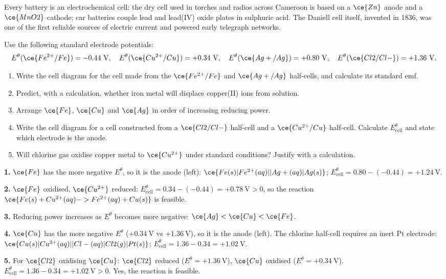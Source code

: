 \documentclass[11pt]{article}
\begin{document}
\begin{savaistu}
Every battery is an electrochemical cell: the dry cell used in torches and radios across Cameroon is based on a $\ce{Zn}$ anode and a $\ce{MnO2}$ cathode; car batteries couple lead and lead(IV) oxide plates in sulphuric acid. The Daniell cell itself, invented in 1836, was one of the first reliable sources of electric current and powered early telegraph networks.
\end{savaistu}

\begin{exercice}
Use the following standard electrode potentials:
\[
E^\theta(\ce{Fe^{2+}/Fe}) = -0.44\ \mathrm{V},\quad E^\theta(\ce{Cu^{2+}/Cu}) = +0.34\ \mathrm{V},\quad E^\theta(\ce{Ag+/Ag}) = +0.80\ \mathrm{V},\quad E^\theta(\ce{Cl2/Cl-}) = +1.36\ \mathrm{V}.
\]
\begin{enumerate}
\item Write the cell diagram for the cell made from the $\ce{Fe^{2+}/Fe}$ and $\ce{Ag+/Ag}$ half-cells, and calculate its standard emf.
\item Predict, with a calculation, whether iron metal will displace copper(II) ions from solution.
\item Arrange $\ce{Fe}$, $\ce{Cu}$ and $\ce{Ag}$ in order of increasing reducing power.
\item Write the cell diagram for a cell constructed from a $\ce{Cl2/Cl-}$ half-cell and a $\ce{Cu^{2+}/Cu}$ half-cell. Calculate $E^\theta_{\text{cell}}$ and state which electrode is the anode.
\item Will chlorine gas oxidise copper metal to $\ce{Cu^{2+}}$ under standard conditions? Justify with a calculation.
\end{enumerate}
\end{exercice}

\begin{corrige}[Exercise 1]
\textbf{1.} $\ce{Fe}$ has the more negative $E^\theta$, so it is the anode (left):
$\ce{Fe(s)|Fe^{2+}(aq)||Ag+(aq)|Ag(s)}$;
$E^\theta_{\text{cell}} = 0.80 - (-0.44) = +1.24\ \mathrm{V}$.

\textbf{2.} $\ce{Fe}$ oxidised, $\ce{Cu^{2+}}$ reduced: $E^\theta_{\text{cell}} = 0.34 - (-0.44) = +0.78\ \mathrm{V} > 0$, so the reaction $\ce{Fe(s) + Cu^{2+}(aq) -> Fe^{2+}(aq) + Cu(s)}$ is feasible.

\textbf{3.} Reducing power increases as $E^\theta$ becomes more negative: $\ce{Ag} < \ce{Cu} < \ce{Fe}$.

\textbf{4.} $\ce{Cu}$ has the more negative $E^\theta$ ($+0.34\ \mathrm{V}$ vs $+1.36\ \mathrm{V}$), so it is the anode (left). The chlorine half-cell requires an inert Pt electrode:
$\ce{Cu(s)|Cu^{2+}(aq)||Cl-(aq)|Cl2(g)|Pt(s)}$;
$E^\theta_{\text{cell}} = 1.36 - 0.34 = +1.02\ \mathrm{V}$.

\textbf{5.} For $\ce{Cl2}$ oxidising $\ce{Cu}$: $\ce{Cl2}$ reduced ($E^\theta = +1.36\ \mathrm{V}$), $\ce{Cu}$ oxidised ($E^\theta = +0.34\ \mathrm{V}$).
$E^\theta_{\text{cell}} = 1.36 - 0.34 = +1.02\ \mathrm{V} > 0$. Yes, the reaction is feasible.
\end{corrige}
\end{document}
